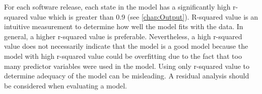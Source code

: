For each software release, each state in the model has a significantly
high r-squared value which is greater than 0.9 (see \ref{chap:Output}).
R-squared value is an intuitive measurement to determine how well
the model fits with the data. In general, a higher r-squared value
is preferable. Nevertheless, a high r-squared value does not necessarily
indicate that the model is a good model because the model with high
r-squared value could be overfitting due to the fact that too many
predictor variables were used in the model. Using only r-squared value
to determine adequacy of the model can be misleading. A residual analysis
should be considered when evaluating a model. %
\begin{comment}
R-squared cannot determine whether the coefficient estimates and predictions
are biased, which is why you must assess the residual plots.

R-squared value cannot be solely used to indicate whether the model
is adequate or not. In order to assess this, a residual analysis is
required. 

There are many factors that affect value of r-squared. One factor
is the number of predictor variables in the model. R-squared value
increases when there are more terms in the model. Another reason,
which is somehow a consequence of adding too many predictor variables,
is that the model might be overfitting the data. As a result, the
model produces misleading high r-squared.
\end{comment}

